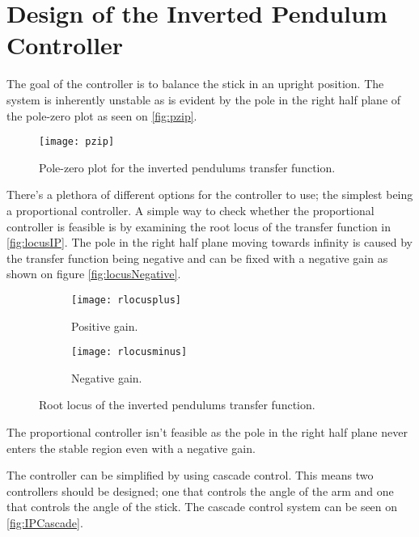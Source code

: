 \graphicspath{{figures/Design/IPController/}}
\chapter{Design of the Inverted Pendulum Controller}\label{sec:IPController}
The goal of the controller is to balance the stick in an upright position. 
The system is inherently unstable as is evident by the pole in the right half plane of the pole-zero plot as seen on \autoref{fig:pzip}.

\begin{figure}[htbp]
\centering
\texttt{[image: pzip]}
\caption{Pole-zero plot for the inverted pendulums transfer function.}
\label{fig:pzip}
\end{figure}

There's a plethora of different options for the controller to use; the simplest being a proportional controller. A simple way to check whether the proportional controller is feasible is by examining the root locus of the transfer function in \autoref{fig:locusIP}. The pole in the right half plane moving towards infinity is caused by the transfer function being negative and can be fixed with a negative gain as shown on figure \autoref{fig:locusNegative}.

\begin{figure}[htbp]
\centering
	\begin{subfigure}{0.45\textwidth}
	\texttt{[image: rlocusplus]}
	\caption{Positive gain.}
	\label{fig:locusIP}
	\end{subfigure}
	\begin{subfigure}{0.45\textwidth}
	\centering
	\texttt{[image: rlocusminus]}
	\caption{Negative gain.}
	\label{fig:locusNegative}
	\end{subfigure}
\caption{Root locus of the inverted pendulums transfer function.}
\end{figure}

The proportional controller isn't feasible as the pole in the right half plane never enters the stable region even with a negative gain.

The controller can be simplified by using cascade control. This means two controllers should be designed; one that controls the angle of the arm and one that controls the angle of the stick. The cascade control system can be seen on \autoref{fig:IPCascade}.

